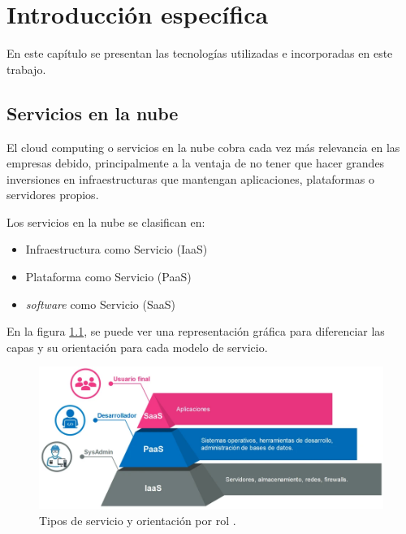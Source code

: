 \chapter{Introducción específica} %

\label{Chapter2}

En este capítulo se presentan las tecnologías utilizadas e incorporadas en este trabajo. 


\section{Servicios en la nube}
El cloud computing o servicios en la nube cobra cada vez más relevancia en las empresas debido, principalmente a la ventaja de no tener que hacer grandes inversiones en infraestructuras que mantengan aplicaciones, plataformas o servidores propios.

Los servicios en la nube se clasifican en:

\begin{itemize}
\item Infraestructura como Servicio (IaaS)
\item Plataforma como Servicio (PaaS)
\item \emph{software} como Servicio (SaaS)
\end{itemize}

En la figura \ref{fig:servicios}, se puede ver una representación gráfica para diferenciar las capas y su orientación para cada modelo de servicio.


\begin{figure}[htbp]
	\centering
	\includegraphics[width=.9\textwidth]{./Figures/servicios.png}
	\caption{Tipos de servicio y orientación por rol \protect\footnotemark.}

	\label{fig:servicios}
\end{figure}


